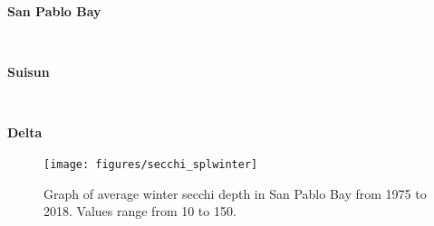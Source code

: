\documentclass[
]{book}
\begin{document}
\begin{panel-grid}

\begin{columns-nocenter}

\begin{column800}

\textbf{San Pablo Bay}

\end{column800}

\begin{column40}

~

\end{column40}

\begin{column800}

\textbf{Suisun}

\end{column800}

\begin{column40}

~

\end{column40}

\begin{column800}

\textbf{Delta}

\end{column800}

\end{columns-nocenter}

\begin{columns-nocenter}

\begin{column800}

\begin{expand}

\begin{figure}
\texttt{[image: figures/secchi\_splwinter]} \caption{Graph of average winter secchi depth in San Pablo Bay from 1975 to 2018. Values range from 10 to 150.}\label{fig:unnamed-chunk-146}
\end{figure}

\end{expand}

\end{column800}

\begin{column40}

~

\end{column40}


\end{columns-nocenter}
\end{panel-grid}
\end{document}
